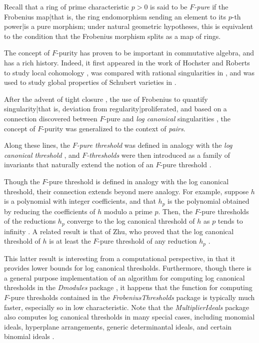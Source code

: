 \documentclass{amsart}
\begin{document}
Recall that a ring of prime characteristic $p>0$ is said to be \emph{$F$-pure} if the Frobenius map|that is, the ring endomorphism sending an element to its $p$-th power|is a pure morphism;  under natural geometric hypotheses, this is equivalent to the condition that the Frobenius morphism splits as a map of rings.

The concept of $F$-purity has proven to be important in commutative algebra, and has a rich history.  Indeed, it first appeared in the work
of Hochster and Roberts to study local cohomology \cite{HochsterRobertsFrobeniusLocalCohomology}, was compared with rational singularities in  \cite{FedderFPureRat}, and was used to study global properties of Schubert varieties in \cite{MehtaRamanathanFrobeniusSplittingAndCohomologyVanishing}.

After the advent of tight closure \cite{HochsterHunekeTC1}, the use of Frobenius to quantify singularity|that is, deviation from regularity|proliferated, and based on a connection discovered between $F$-pure and \emph{log canonical} singularities \cite{HaraWatanabeFRegFPure}, the concept of $F$-purity was generalized to the context of \emph{pairs}.

Along these lines, the \emph{$F$-pure threshold} %
was defined in analogy with the \emph{log canonical threshold} \cite{TakagiWatanabeFPureThresh}, and
\emph{$F$-thresholds} were then introduced as a family of invariants that naturally extend the notion of an $F$-pure threshold \cite{MustataTakagiWatanabeFThresholdsAndBernsteinSato}.

Though the $F$-pure threshold is defined in analogy with the log canonical threshold, their connection extends beyond mere analogy. For example, suppose $h$ is a polynomial with integer coefficients, and that $h_p$ is the polynomial obtained by reducing the coefficients of $h$ modulo a prime $p$.  Then, the $F$-pure thresholds of the reductions $h_p$ converge to the log canonical threshold of $h$ as $p$ tends to infinity \cite{HaraYoshidaGeneralizationOfTightClosure}.
A related result is that of Zhu, who proved that the log canonical threshold of $h$ is at least the $F$-pure threshold of any reduction $h_p$ \cite[Corollary 4.2]{ZhuLogCanoincalThresholdsInPositiveChar}.

This latter result is interesting from a computational perspective, in that it provides lower bounds for log canonical thresholds.  Furthermore, though there is a general purpose implementation of an algorithm for computing log canonical thresholds in the \emph{Dmodules} package \cite{DmodulesSource}, it happens that the function for computing $F$-pure thresholds contained in the \emph{FrobeniusThresholds} package is typically much faster, especially so in low characteristic.
Note that the  \emph{MultiplierIdeals}  package also computes log canonical thresholds in many special cases, including monomial ideals, hyperplane arrangements, generic determinantal ideals, and certain binomial ideals \cite{MultiplierIdealsPackage, MultiplierIdealsArticle}.
\end{document}
